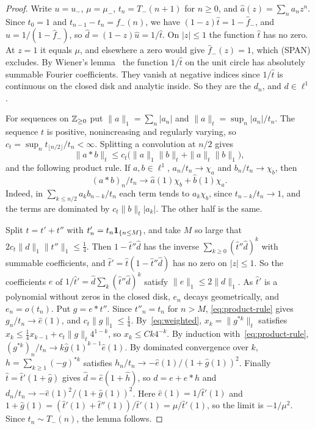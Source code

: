 \begin{proof}
Write $u=u_\minus$, $\mu=\mu_\minus$, $t_n=T_\minus(n+1)$ for $n\ge0$, and
$\hat a(z)=\sum_na_nz^n$. Since $t_0=1$ and $t_{n-1}-t_n=f_\minus(n)$, we have
$(1-z)\hat t=1-\hat f_\minus$, and $\hat u=1/(1-\hat f_\minus)$, so $\hat d=(1-z)\hat u=1/\hat t$.
On $|z|\le1$ the function $\hat t$ has no zero. At $z=1$ it equals $\mu$, and elsewhere a zero
would give $\hat f_\minus(z)=1$, which (SPAN) excludes. By Wiener's lemma~\cite{wiener1932}
the function $1/\hat t$ on the unit circle has absolutely summable Fourier coefficients. They
vanish at negative indices since $1/\hat t$ is continuous on the closed disk and analytic
inside. So they are the $d_n$, and $d\in\ell^1$.

For sequences on $\mathbb{Z}_{\ge0}$ put $\|a\|_1=\sum_n|a_n|$ and $\|a\|_t=\sup_n|a_n|/t_n$. The
sequence $t$ is positive, nonincreasing and regularly varying, so
$c_t=\sup_nt_{\lfloor n/2\rfloor}/t_n<\infty$. Splitting a convolution at $n/2$ gives
\begin{equation}\label{eq:weighted}
 \|a*b\|_t\le c_t\bigl(\|a\|_1\|b\|_t+\|a\|_t\|b\|_1\bigr),
\end{equation}
and the following product rule. If $a,b\in\ell^1$, $a_n/t_n\to\chi_a$ and $b_n/t_n\to\chi_b$,
then
\begin{equation}\label{eq:product-rule}
 (a*b)_n/t_n\to\hat a(1)\chi_b+\hat b(1)\chi_a .
\end{equation}
Indeed, in $\sum_{k\le n/2}a_kb_{n-k}/t_n$ each term tends to $a_k\chi_b$, since
$t_{n-k}/t_n\to1$, and the terms are dominated by $c_t\|b\|_t|a_k|$. The other half is the
same.

Split $t=t'+t''$ with $t'_n=t_n\mathbf{1}_{\{n\le M\}}$, and take $M$ so large that
$2c_t\|d\|_1\|t''\|_1\le\frac14$. Then $1-\hat t''\hat d$ has the inverse
$\sum_{k\ge0}(\hat t''\hat d)^k$ with summable coefficients, and
$\hat t'=\hat t(1-\hat t''\hat d)$ has no zero on $|z|\le1$. So the coefficients $e$ of
$1/\hat t'=\hat d\sum_k(\hat t''\hat d)^k$ satisfy $\|e\|_1\le2\|d\|_1$. As $\hat t'$ is a
polynomial without zeros in the closed disk, $e_n$ decays geometrically, and $e_n=o(t_n)$.
Put $g=e*t''$. Since $t''_n=t_n$ for $n>M$, \eqref{eq:product-rule} gives
$g_n/t_n\to\hat e(1)$, and $c_t\|g\|_1\le\frac14$. By~\eqref{eq:weighted},
$x_k=\|g^{*k}\|_t$ satisfies $x_k\le\frac14x_{k-1}+c_t\|g\|_t4^{1-k}$, so $x_k\le Ck4^{-k}$.
By induction with~\eqref{eq:product-rule}, $(g^{*k})_n/t_n\to k\hat g(1)^{k-1}\hat e(1)$.
By dominated convergence over $k$, $h=\sum_{k\ge1}(-g)^{*k}$ satisfies
$h_n/t_n\to-\hat e(1)/(1+\hat g(1))^2$. Finally $\hat t=\hat t'(1+\hat g)$ gives
$\hat d=\hat e(1+\hat h)$, so $d=e+e*h$ and $d_n/t_n\to-\hat e(1)^2/(1+\hat g(1))^2$. Here
$\hat e(1)=1/\hat t'(1)$ and $1+\hat g(1)=(\hat t'(1)+\hat t''(1))/\hat t'(1)=\mu/\hat t'(1)$,
so the limit is $-1/\mu^2$. Since $t_n\sim T_\minus(n)$, the lemma follows.
\end{proof}

